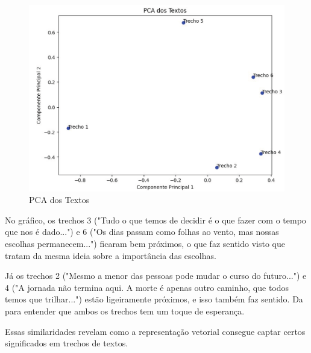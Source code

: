 \begin{figure}[H]
\centering
\includegraphics[width=1\linewidth]{apendices/fig/IAA015_3.png}
\caption{PCA dos Textos}
\end{figure}

No gráfico, os trechos 3 ("Tudo o que temos de decidir é o que fazer com o tempo que nos é dado...") e 6 ("Os dias passam como folhas ao vento, mas nossas escolhas permanecem...") ficaram bem próximos, o que faz sentido visto que tratam da mesma ideia sobre a importância das escolhas.

Já os trechos 2 ("Mesmo a menor das pessoas pode mudar o curso do futuro...") e 4 ("A jornada não termina aqui. A morte é apenas outro caminho, que todos temos que trilhar...") estão ligeiramente próximos, e isso também faz sentido. Da para entender que ambos os trechos tem um toque de esperança.

Essas similaridades revelam como a representação vetorial consegue captar certos significados em trechos de textos.